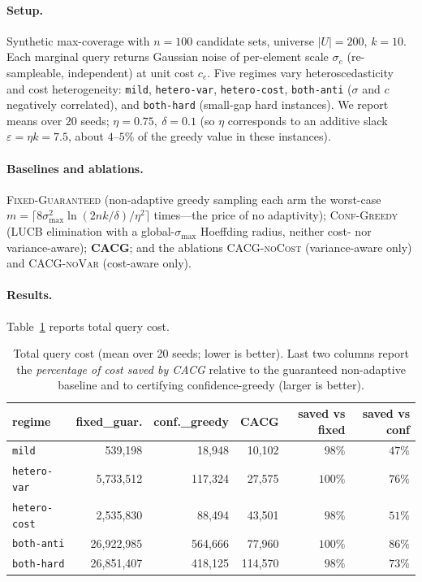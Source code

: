 \documentclass[11pt]{article}
\theoremstyle{plain}
\theoremstyle{definition}
\begin{document}
\paragraph{Setup.}
Synthetic max-coverage with $n=100$ candidate sets, universe $|U|=200$,
$k=10$. Each marginal query returns Gaussian noise of per-element scale
$\sigma_e$ (re-sampleable, independent) at unit cost $c_e$. Five regimes
vary heteroscedasticity and cost heterogeneity: \texttt{mild},
\texttt{hetero-var}, \texttt{hetero-cost}, \texttt{both-anti} ($\sigma$ and
$c$ negatively correlated), and \texttt{both-hard} (small-gap hard
instances). We report means over $20$ seeds; $\eta=0.75,\ \delta=0.1$
(so $\eta$ corresponds to an additive slack $\varepsilon=\eta k=7.5$, about
$4$--$5\%$ of the greedy value in these instances).

\paragraph{Baselines and ablations.}
\textsc{Fixed-Guaranteed} (non-adaptive greedy sampling each arm the
worst-case $m=\lceil 8\sigma_{\max}^2\ln(2nk/\delta)/\eta^2\rceil$ times---the
price of no adaptivity); \textsc{Conf-Greedy} (LUCB
elimination with a global-$\sigma_{\max}$ Hoeffding radius, neither cost- nor
variance-aware); \textbf{CACG}; and the ablations \textsc{CACG-noCost}
(variance-aware only) and \textsc{CACG-noVar} (cost-aware only).

\paragraph{Results.}
Table~\ref{tab:results} reports total query cost.
\begin{table}[H]
\centering\small
\caption{Total query cost (mean over 20 seeds; lower is better). Last two
columns report the \emph{percentage of cost saved by CACG} relative to the
guaranteed non-adaptive baseline and to certifying confidence-greedy
(larger is better).}\label{tab:results}
\begin{tabular}{lrrrrr}
\toprule
regime & fixed\_guar. & conf.\_greedy & CACG & saved vs fixed & saved vs conf\\
\midrule
\texttt{mild}        & 539{,}198   & 18{,}948  & 10{,}102  & $98\%$  & $47\%$\\
\texttt{hetero-var}  & 5{,}733{,}512 & 117{,}324 & 27{,}575 & $100\%$ & $76\%$\\
\texttt{hetero-cost} & 2{,}535{,}830 & 88{,}494  & 43{,}501 & $98\%$  & $51\%$\\
\texttt{both-anti}   & 26{,}922{,}985 & 564{,}666 & 77{,}960 & $100\%$ & $86\%$\\
\texttt{both-hard}   & 26{,}851{,}407 & 418{,}125 & 114{,}570 & $98\%$ & $73\%$\\
\bottomrule
\end{tabular}
\end{table}
\end{document}
